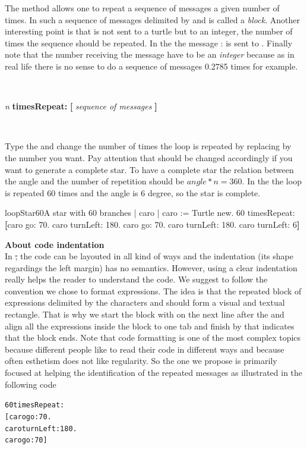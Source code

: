 

The method \timesRepeat allows one to repeat a sequence of messages a given number of times. In \sq such a sequence of messages delimited by \ct{[} and \ct{]} is called a \emph{block}. Another interesting point is that \timesRepeat is not sent to a turtle but to an integer, the number of times the sequence should be repeated. In the
 the message \timesRepeat: \ct{[...]} is sent
to . Finally note that the number receiving the message \timesRepeat have to be an \emph{integer} because as in real life there is no sense to do a sequence of 
messages 0.2785 times for example.

\ 
\begin{template}
\textit{n} \textbf{timesRepeat:}
   \textbf{[} \textit{sequence of messages} \textbf{]}
\end{template}
\ 


Type the  and change the number of
times the loop is repeated by replacing  by the number you want.
Pay attention that \ct{60} should be changed accordingly if you want
to generate a complete star. To have a complete star the relation
between the angle and the number of repetition should be $angle * n =
360$. In the \scriptref{scr:starsixty} the loop is repeated 60 times and the angle is 6 degree, so the star is complete. 

\begin{scriptfig}{loopStar60}{A star with 60 branches}\label{scr:starsixty}
| caro |
caro := Turtle new.
60 timesRepeat: 
      \textbf{[}caro  go: 70.
      caro  turnLeft: 180.
      caro go: 70.
      caro turnLeft: 180.
      caro turnLeft: 6\textbf{]}
\end{scriptfig}


\begin{teacher} \textbf{About code indentation}\\
In \st, the code can be layouted in all kind of ways and the indentation (its shape regardings the left margin) has no semantics. However, using a clear indentation really helps the reader to understand the code. We suggest to follow the convention we chose to format  expressions. The idea is that the repeated block of expressions delimited by the characters \ct{[} and \ct{]} should form a visual and textual rectangle. That is why we start the block with \ct{[} on the next line after the  and align all the expressions inside the block to one tab and finish by \ct{]} that indicates that the block ends. Note that code formatting is one of the most complex topics because different people like to read their code in different ways and because often esthetism does not like regularity. So the one we propose is primarily focused at helping the identification of the repeated messages as illustrated in the following code

\begin{alltt}
60 timesRepeat: 
      [caro  go: 70.
      caro  turnLeft: 180.
      caro go: 70]
\end{alltt}
\ 
\end{teacher}

